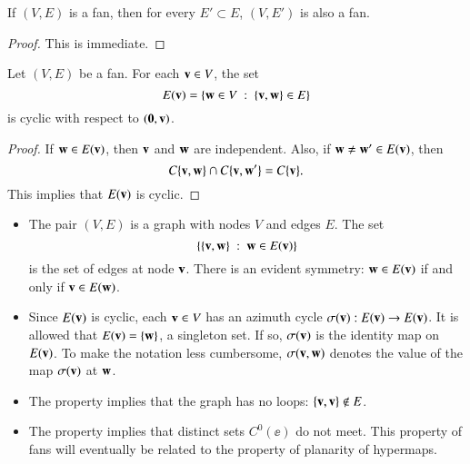 \begin{lemma}\label{lemma:subset-fan}
If $(V,E)$ is a fan, then for every $E'\subset E$,  $(V,E')$ is also a fan.
\end{lemma}

\begin{proof} This is immediate.
\end{proof}

\begin{lemma}  Let $(V,E)$ be a fan.
For each ${\mathbf v}\in V$, the set
        $$
        E({\mathbf v}) = \{{\mathbf w}\in V\ :\  \{{\mathbf v},{\mathbf w}\}\in E\}
        $$
        is cyclic with respect to $({\mathbf 0},{\mathbf v})$.
\end{lemma}
%

\begin{proof}  If ${\mathbf w}\in E({\mathbf v})$, then ${\mathbf v}$ and ${\mathbf w}$ are independent.
Also, if ${\mathbf w}\ne {\mathbf w}'\in E({\mathbf v})$, then
$$
C\{{\mathbf v},{\mathbf w}\}\cap C\{{\mathbf v},{\mathbf w}'\} = C\{{\mathbf v}\}.
$$
This implies that $E({\mathbf v})$ is cyclic.
\end{proof}

\begin{remark}
\begin{itemize}
\item The pair $(V,E)$ is a graph with nodes $V$ and edges $E$.  The set
$$\{\{{\mathbf v},{\mathbf w}\}\ :\  {\mathbf w}\in E({\mathbf v})\}$$ is the set of edges at node ${\mathbf v}$.
There is an evident symmetry:  ${\mathbf w}\in E({\mathbf v})$ if and only if ${\mathbf v}\in E({\mathbf w})$.   
%
\item
Since $E({\mathbf v})$ is cyclic,
each ${\mathbf v}\in V$ has an azimuth cycle $\sigma({\mathbf v}):E({\mathbf v})\to E({\mathbf v})$.
It is allowed that $E({\mathbf v}) = \{{\mathbf w}\}$,  a
%
singleton set. If so,
$\sigma({\mathbf v})$ is the identity map on $E({\mathbf v})$.
%
To make the notation less cumbersome, $\sigma({\mathbf v},{\mathbf w})$ denotes the value of the map $\sigma({\mathbf v})$ at ${\mathbf w}$.
%
\item 
The property  implies that the graph has no loops: $\{{\mathbf v},{\mathbf v}\}\not\in E$.
%
\item The property  implies that distinct sets $C^0(\ee)$
do not meet.   This property of fans will eventually be related to  the property of planarity of hypermaps.
%
%
%
%
\end{itemize}
\end{remark}

